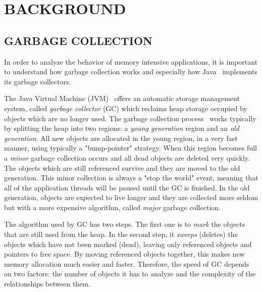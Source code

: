 \documentclass[a4paper,twoside]{article}
\begin{document}
\section{\uppercase{Background}}
\label{background}

\subsection{\uppercase{Garbage Collection}}
\label{background:gc}

In order to analyze the behavior of memory intensive applications,
it is important to understand how garbage collection works and especially how Java~\cite{java} implements its garbage collectors.

The Java Virtual Machine (JVM)~\cite{lindholm:2014} offers an automatic storage management system, called {\textit{garbage collector}  (GC)} which reclaims heap storage occupied by objects which are no longer used.
The garbage collection process~\cite{gc:oracle} works typically by splitting the heap into two regions: a {\textit{young generation}} region and an {\textit{old generation}}.
All new objects are allocated in the young region, in a very fast manner, using typically a "bump-pointer" strategy.
When this region becomes full  a {\textit{minor}} garbage collection occurs and all dead objects are deleted very quickly.
The objects which are still referenced survive and they  are moved to the old generation.
This minor collection is always a "stop the world" event, meaning that all of the application threads will be paused until the GC is finished.
In the old generation, objects are expected to live longer and they are collected more seldom but with a more expensive algorithm, called {\textit{major}} garbage collection.

The algorithm used by GC has two steps.
The first one is to {\textit{mark}} the objects that are still used from the heap.
In the second step, it {\textit{sweeps}  (deletes)} the objects which have not been marked (dead), leaving only referenced objects and pointers to free space.
By moving referenced objects together, this makes new memory allocation much easier and faster.
Therefore, the speed of GC depends on two factors: the number of objects it has to analyze and the complexity of the relationships between them. %
\end{document}
